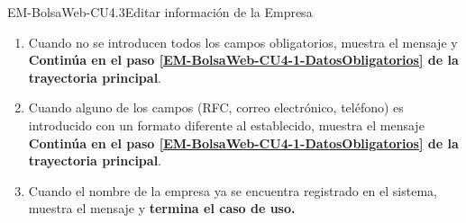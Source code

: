 \begin{UseCase}{EM-BolsaWeb-CU4.3}{Editar información de la Empresa}
{\begin{enumerate}
			\item \label{EM-BolsaWeb-CU4-3-E1} Cuando no se introducen todos los campos obligatorios, muestra el mensaje  y \textbf{Continúa en el paso \ref{EM-BolsaWeb-CU4-1-DatosObligatorios} de la trayectoria principal}.
			\item \label{EM-BolsaWeb-CU4-3-E2} Cuando alguno de los campos (RFC, correo electrónico, teléfono) es introducido con un formato diferente al establecido, muestra el mensaje  \textbf{Continúa en el paso \ref{EM-BolsaWeb-CU4-1-DatosObligatorios} de la trayectoria principal}.
			\item \label{EM-BolsaWeb-CU4-3-E3} Cuando el nombre de la empresa ya se encuentra registrado en el sistema, muestra el mensaje  y \textbf{termina el caso de uso.}
		\end{enumerate}	
	}
\end{UseCase}

